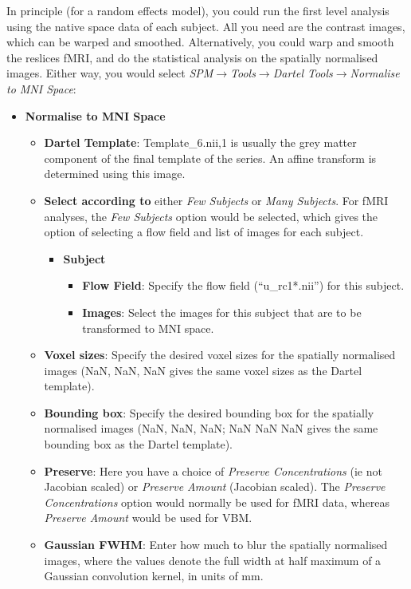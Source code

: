 In principle (for a random effects model), you could run the first level analysis using the native space data of each subject.
All you need are the contrast images, which can be warped and smoothed.
Alternatively, you could warp and smooth the reslices fMRI, and do the statistical analysis on the spatially normalised images.
Either way, you would select \emph{SPM$\rightarrow$Tools$\rightarrow$Dartel Tools$\rightarrow$Normalise to MNI Space}:
\begin{itemize}
\item{{\bf Normalise to MNI Space}
    \begin{itemize}
    \item{{\bf Dartel Template}: Template\_6.nii,1 is usually the grey matter component of the final template of the series.  An affine transform is determined using this image.}
    \item{{\bf Select according to} either \emph{Few Subjects} or \emph{Many Subjects}.  For fMRI analyses, the \emph{Few Subjects} option would be selected, which gives the option of selecting a flow field and list of images for each subject.
      \begin{itemize}
      \item{{\bf Subject}
        \begin{itemize}
        \item{{\bf Flow Field}: Specify the flow field (``u\_rc1*.nii'') for this subject.}
        \item{{\bf Images}: Select the images for this subject that are to be transformed to MNI space.}
        \end{itemize}
      }
      \end{itemize}
    }
    \item{{\bf Voxel sizes}: Specify the desired voxel sizes for the spatially normalised images (NaN, NaN, NaN gives the same voxel sizes as the Dartel template).}
    \item{{\bf Bounding box}: Specify the desired bounding box for the spatially normalised images (NaN, NaN, NaN; NaN NaN NaN gives the same bounding box as the Dartel template).}
    \item{{\bf Preserve}: Here you have a choice of \emph{Preserve Concentrations} (ie not Jacobian scaled) or \emph{Preserve Amount} (Jacobian scaled).  The \emph{Preserve Concentrations} option would normally be used for fMRI data, whereas \emph{Preserve Amount} would be used for VBM.}
    \item{{\bf Gaussian FWHM}: Enter how much to blur the spatially normalised images, where the values denote the full width at half maximum of a Gaussian convolution kernel, in units of mm.}
    \end{itemize}
}
\end{itemize}


